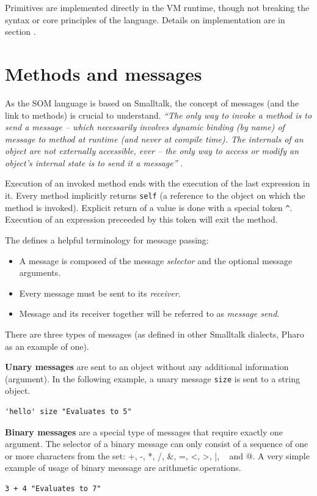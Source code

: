 \documentclass[thesis=M,english]{FITthesis}[2019/12/23]
\begin{document}
Primitives are implemented directly in the VM runtime, though not breaking the syntax or core principles of the
language. Details on implementation are in section .

\section{Methods and messages}
As the SOM language is based on Smalltalk, the concept of messages (and the link to methods) is crucial to understand.
\textit{``The only way to invoke a method is to send a message -- which necessarily involves dynamic binding
(by name) of message to method at runtime (and never at compile time). The internals of an object are not
externally accessible, ever -- the only way to access or modify an object's internal state is to send it
a message''} \cite{smalltalk-essentials}.

Execution of an invoked method ends with the execution of the last expression in it. Every method implicitly
returns \texttt{self} (a reference to the object on which the method is invoked). Explicit return of a value
is done with a special token \texttt{\^}. Execution of an expression preceeded by this token will exit the method.

The \cite{pharo-by-example} defines a helpful terminology for message passing:
\begin{itemize}
	\item A message is composed of the message \textit{selector} and the optional message arguments.
	\item Every message must be sent to its \textit{receiver}.
	\item Message and its receiver together will be referred to as \textit{message send}.
\end{itemize}

There are three types of messages (as defined in other Smalltalk dialects, Pharo as an example of one).

\textbf{Unary messages} are sent to an object without any additional information (argument). In the following
example, a unary message \texttt{size} is sent to a string object.
\begin{lstlisting}[language=Smalltalk]
	'hello' size "Evaluates to 5"
\end{lstlisting}

\textbf{Binary messages} are a special type of messages that require exactly one argument. The selector
of a binary message can only consist of a sequence of one or more characters from the set: +, -, *, /,
\&, =, \textless, \textgreater, |, ~ and @. A very simple example of usage of binary messsage are arithmetic operations.
\begin{lstlisting}[language=Smalltalk]
	3 + 4 "Evaluates to 7"
\end{lstlisting}
\end{document}
